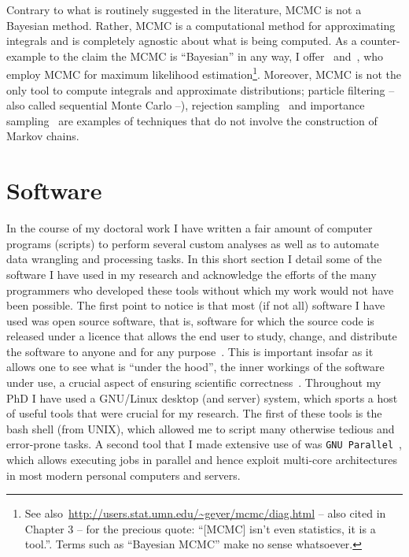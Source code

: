 Contrary to what is routinely suggested in the literature, MCMC is not a Bayesian method.
Rather, MCMC is a computational method for approximating integrals and is completely agnostic about what is being computed.
As a counter-example to the claim the MCMC is ``Bayesian'' in any way, I offer~\cite{Geyer1991} and~\cite{Kuhner1998}, who employ MCMC for maximum likelihood estimation\footnote{See also~\url{http://users.stat.umn.edu/~geyer/mcmc/diag.html} -- also cited in Chapter 3 -- for the precious quote: ``[MCMC] isn't even statistics, it is a tool.''. Terms such as ``Bayesian MCMC'' make no sense whatsoever. }.
Moreover, MCMC is not the only tool to compute integrals and approximate distributions; particle filtering -- also called sequential Monte Carlo --\citep{DelMoral1996}), rejection sampling~\citep{Casella2004} and importance sampling~\citep{Rubinstein2016} are examples of techniques that do not involve the construction of Markov chains.

\section{Software}
\label{sec:software}

In the course of my doctoral work I have written a fair amount of computer programs (scripts) to perform several custom analyses as well as to automate data wrangling and processing tasks.
In this short section I detail some of the software I have used in my research and acknowledge the efforts of the many programmers who developed these tools without which my work would not have been possible.
The first point to notice is that most (if not all) software I have used was open source software, that is, software for which the source code is released under a licence that allows the end user to study, change, and distribute the software to anyone and for any purpose~\citep{Laurent2004}.
This is important insofar as it allows one to see what is ``under the hood'', the inner workings of the software under use, a crucial aspect of ensuring scientific correctness~\citep{Darriba2018}.
Throughout my PhD I have used a GNU/Linux desktop (and server) system, which sports a host of useful tools that were crucial for my research.
The first of these tools is the bash shell (from UNIX), which allowed me to script many otherwise tedious and error-prone tasks.
A second tool that I made extensive use of was \verb|GNU Parallel|~\citep{Tange2011}, which allows executing jobs in parallel and hence exploit multi-core architectures in most modern personal computers and servers.

